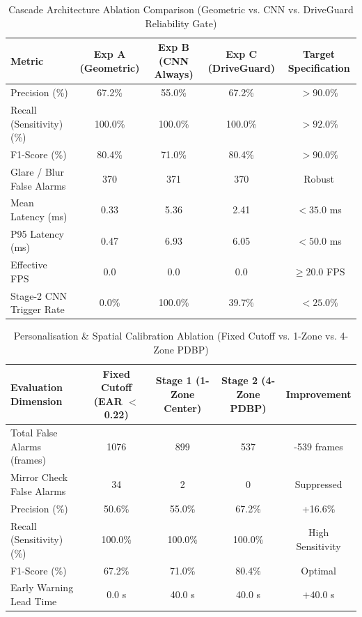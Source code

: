 
\begin{table}[htbp]
\centering
\caption{Cascade Architecture Ablation Comparison (Geometric vs. CNN vs. DriveGuard Reliability Gate)}
\label{tab:cascade_ablation}
\begin{tabular}{lcccc}
\hline
\textbf{Metric} & \textbf{Exp A (Geometric)} & \textbf{Exp B (CNN Always)} & \textbf{Exp C (DriveGuard)} & \textbf{Target Specification} \\
\hline
Precision (\%) & 67.2\% & 55.0\% & 67.2\% & $>90.0\%$ \\
Recall (Sensitivity) (\%) & 100.0\% & 100.0\% & 100.0\% & $>92.0\%$ \\
F1-Score (\%) & 80.4\% & 71.0\% & 80.4\% & $>90.0\%$ \\
Glare / Blur False Alarms & 370 & 371 & 370 & Robust \\
Mean Latency (ms) & 0.33 & 5.36 & 2.41 & $<35.0$ ms \\
P95 Latency (ms) & 0.47 & 6.93 & 6.05 & $<50.0$ ms \\
Effective FPS & 0.0 & 0.0 & 0.0 & $\ge 20.0$ FPS \\
Stage-2 CNN Trigger Rate & 0.0\% & 100.0\% & 39.7\% & $<25.0\%$ \\
\hline
\end{tabular}
\end{table}

\begin{table}[htbp]
\centering
\caption{Personalisation \& Spatial Calibration Ablation (Fixed Cutoff vs. 1-Zone vs. 4-Zone PDBP)}
\label{tab:calibration_ablation}
\begin{tabular}{lcccc}
\hline
\textbf{Evaluation Dimension} & \textbf{Fixed Cutoff (EAR $<$ 0.22)} & \textbf{Stage 1 (1-Zone Center)} & \textbf{Stage 2 (4-Zone PDBP)} & \textbf{Improvement} \\
\hline
Total False Alarms (frames) & 1076 & 899 & 537 & -539 frames \\
Mirror Check False Alarms & 34 & 2 & 0 & Suppressed \\
Precision (\%) & 50.6\% & 55.0\% & 67.2\% & +16.6\% \\
Recall (Sensitivity) (\%) & 100.0\% & 100.0\% & 100.0\% & High Sensitivity \\
F1-Score (\%) & 67.2\% & 71.0\% & 80.4\% & Optimal \\
Early Warning Lead Time & 0.0 s & 40.0 s & 40.0 s & $+40.0$ s \\
\hline
\end{tabular}
\end{table}
